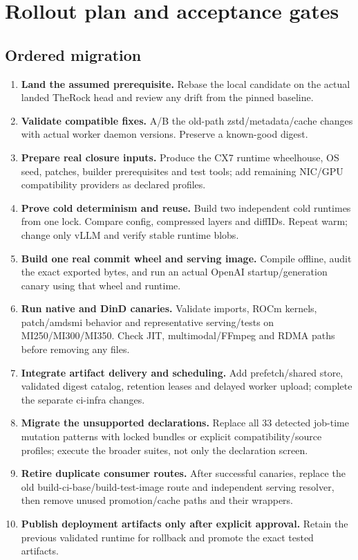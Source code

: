 \documentclass[11pt,a4paper]{article}
\begin{document}
\section{Rollout plan and acceptance gates}

\subsection{Ordered migration}

\begin{enumerate}
\item \textbf{Land the assumed prerequisite.} Rebase the local candidate on the
actual landed TheRock head and review any drift from the pinned baseline.
\item \textbf{Validate compatible fixes.} A/B the old-path zstd/metadata/cache
changes with actual worker daemon versions. Preserve a known-good digest.
\item \textbf{Prepare real closure inputs.} Produce the CX7 runtime wheelhouse,
OS seed, patches, builder prerequisites and test tools; add remaining NIC/GPU
compatibility providers as declared profiles.
\item \textbf{Prove cold determinism and reuse.} Build two independent cold
runtimes from one lock. Compare config, compressed layers and diffIDs. Repeat
warm; change only vLLM and verify stable runtime blobs.
\item \textbf{Build one real commit wheel and serving image.} Compile offline,
audit the exact exported bytes, and run an actual OpenAI startup/generation
canary using that wheel and runtime.
\item \textbf{Run native and DinD canaries.} Validate imports, ROCm kernels,
patch/amdsmi behavior and representative serving/tests on MI250/MI300/MI350.
Check JIT, multimodal/FFmpeg and RDMA paths before removing any files.
\item \textbf{Integrate artifact delivery and scheduling.} Add prefetch/shared
store, validated digest catalog, retention leases and delayed worker upload;
complete the separate ci-infra changes.
\item \textbf{Migrate the unsupported declarations.} Replace all 33 detected
job-time mutation patterns with locked bundles or explicit compatibility/source
profiles; execute the broader suites, not only the declaration screen.
\item \textbf{Retire duplicate consumer routes.} After successful canaries,
replace the old build-ci-base/build-test-image route and independent serving
resolver, then remove unused promotion/cache paths and their wrappers.
\item \textbf{Publish deployment artifacts only after explicit approval.} Retain the previous
validated runtime for rollback and promote the exact tested artifacts.
\end{enumerate}
\end{document}
